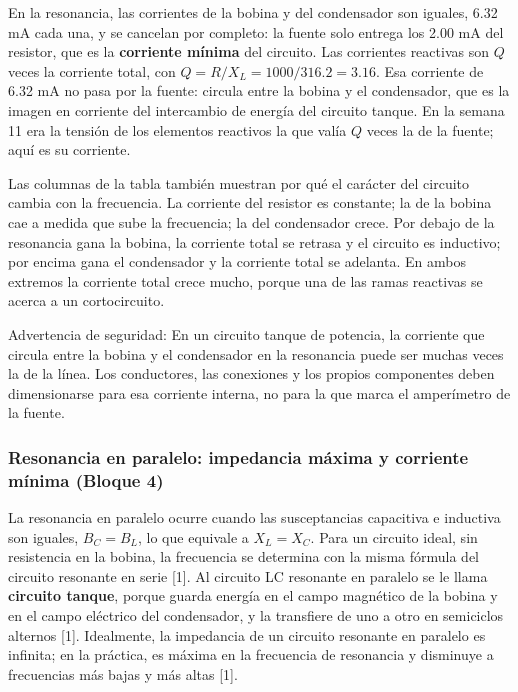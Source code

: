 \documentclass[11pt,letterpaper]{article}
\begin{document}
En la resonancia, las corrientes de la bobina y del condensador son iguales, 6.32 mA cada una, y se cancelan por completo: la fuente solo entrega los 2.00 mA del resistor, que es la \textbf{corriente mínima} del circuito. Las corrientes reactivas son $Q$ veces la corriente total, con $Q = R/X_L = 1000/316.2 = 3.16$. Esa corriente de 6.32 mA no pasa por la fuente: circula entre la bobina y el condensador, que es la imagen en corriente del intercambio de energía del circuito tanque. En la semana 11 era la tensión de los elementos reactivos la que valía $Q$ veces la de la fuente; aquí es su corriente.

Las columnas de la tabla también muestran por qué el carácter del circuito cambia con la frecuencia. La corriente del resistor es constante; la de la bobina cae a medida que sube la frecuencia; la del condensador crece. Por debajo de la resonancia gana la bobina, la corriente total se retrasa y el circuito es inductivo; por encima gana el condensador y la corriente total se adelanta. En ambos extremos la corriente total crece mucho, porque una de las ramas reactivas se acerca a un cortocircuito.

\begin{nota}{Advertencia de seguridad:}
En un circuito tanque de potencia, la corriente que circula entre la bobina y el condensador en la resonancia puede ser muchas veces la de la línea. Los conductores, las conexiones y los propios componentes deben dimensionarse para esa corriente interna, no para la que marca el amperímetro de la fuente.
\end{nota}

\subsubsection{Resonancia en paralelo: impedancia máxima y corriente mínima (Bloque 4)}

La resonancia en paralelo ocurre cuando las susceptancias capacitiva e inductiva son iguales, $B_C = B_L$, lo que equivale a $X_L = X_C$. Para un circuito ideal, sin resistencia en la bobina, la frecuencia se determina con la misma fórmula del circuito resonante en serie [1]. Al circuito LC resonante en paralelo se le llama \textbf{circuito tanque}, porque guarda energía en el campo magnético de la bobina y en el campo eléctrico del condensador, y la transfiere de uno a otro en semiciclos alternos [1]. Idealmente, la impedancia de un circuito resonante en paralelo es infinita; en la práctica, es máxima en la frecuencia de resonancia y disminuye a frecuencias más bajas y más altas [1].
\end{document}
